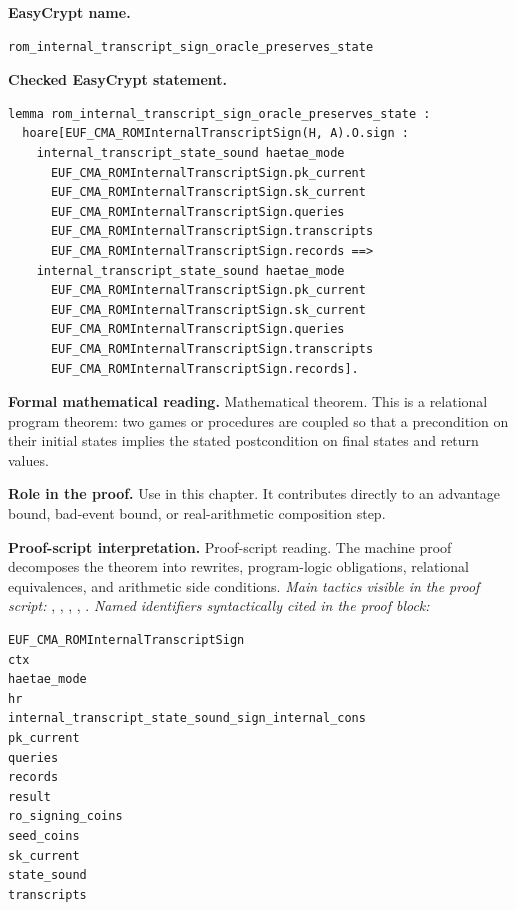 \begin{formaltheorem}
\noindent\textbf{EasyCrypt name.}
\begin{lstlisting}[language=EasyCrypt,basicstyle=\ttfamily\scriptsize]
rom_internal_transcript_sign_oracle_preserves_state
\end{lstlisting}
\noindent\textbf{Checked EasyCrypt statement.}
\begin{lstlisting}[language=EasyCrypt,basicstyle=\ttfamily\scriptsize]
lemma rom_internal_transcript_sign_oracle_preserves_state :
  hoare[EUF_CMA_ROMInternalTranscriptSign(H, A).O.sign :
    internal_transcript_state_sound haetae_mode
      EUF_CMA_ROMInternalTranscriptSign.pk_current
      EUF_CMA_ROMInternalTranscriptSign.sk_current
      EUF_CMA_ROMInternalTranscriptSign.queries
      EUF_CMA_ROMInternalTranscriptSign.transcripts
      EUF_CMA_ROMInternalTranscriptSign.records ==>
    internal_transcript_state_sound haetae_mode
      EUF_CMA_ROMInternalTranscriptSign.pk_current
      EUF_CMA_ROMInternalTranscriptSign.sk_current
      EUF_CMA_ROMInternalTranscriptSign.queries
      EUF_CMA_ROMInternalTranscriptSign.transcripts
      EUF_CMA_ROMInternalTranscriptSign.records].
\end{lstlisting}
\noindent\textbf{Formal mathematical reading.}
Mathematical theorem. This is a relational program theorem: two games or procedures are coupled so that a precondition on their initial states implies the stated postcondition on final states and return values.

\noindent\textbf{Role in the proof.}
Use in this chapter. It contributes directly to an advantage bound, bad-event bound, or real-arithmetic composition step.

\noindent\textbf{Proof-script interpretation.}
Proof-script reading. The machine proof decomposes the theorem into rewrites, program-logic obligations, relational equivalences, and arithmetic side conditions.
\emph{Main tactics visible in the proof script:} , , , , .
\emph{Named identifiers syntactically cited in the proof block:}
\begin{lstlisting}[language=EasyCrypt,basicstyle=\ttfamily\scriptsize]
EUF_CMA_ROMInternalTranscriptSign
ctx
haetae_mode
hr
internal_transcript_state_sound_sign_internal_cons
pk_current
queries
records
result
ro_signing_coins
seed_coins
sk_current
state_sound
transcripts
\end{lstlisting}

\end{formaltheorem}

